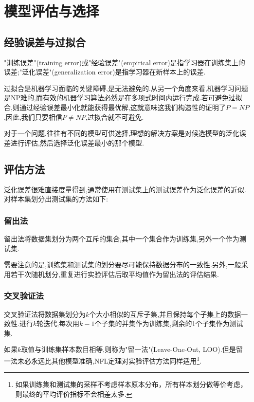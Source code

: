 \chapter{模型评估与选择}

\section{经验误差与过拟合}

"训练误差"(training error)或"经验误差"(empirical error)是指学习器在训练集上的误差;"泛化误差"(generalization error)是指学习器在新样本上的误差.

过拟合是机器学习面临的关键障碍,是无法避免的.从另一个角度来看,机器学习问题是NP难的,而有效的机器学习算法必然是在多项式时间内运行完成.若可避免过拟合,则通过经验误差最小化就能获得最优解,这就意味这我们构造性的证明了$P=NP$,因此,我们只要相信$P\ne NP$,过拟合就不可避免.

对于一个问题,往往有不同的模型可供选择,理想的解决方案是对候选模型的泛化误差进行评估,然后选择泛化误差最小的那个模型.

\section{评估方法}

泛化误差很难直接度量得到,通常使用在测试集上的测试误差作为泛化误差的近似.对样本集划分出测试集的方法如下:

\subsection{留出法}

留出法将数据集划分为两个互斥的集合,其中一个集合作为训练集,另外一个作为测试集.

需要注意的是,训练集和测试集的划分要尽可能保持数据分布的一致性.另外,一般采用若干次随机划分,重复进行实验评估后取平均值作为留出法的评估结果.

\subsection{交叉验证法}

交叉验证法将数据集划分为$k$个大小相似的互斥子集,并且保持每个子集上的数据一致性.进行$k$轮迭代,每次用$k-1$个子集的并集作为训练集,剩余的1个子集作为测试集.

如果$k$取值与训练集样本数目相等,则称为"留一法"(Leave-One-Out, LOO).但是留一法未必永远比其他模型准确,NFL定理对实验评估方法同样适用\footnote{如果训练集和测试集的采样不考虑样本原本分布，所有样本划分做等价考虑，则最终的平均评价指标不会相差太多.}.

